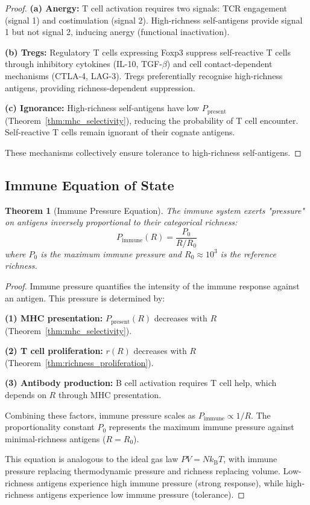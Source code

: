 \documentclass[11pt,twocolumn,a4paper]{article}
\newtheorem{theorem}{Theorem}[section]
\theoremstyle{definition}
\theoremstyle{remark}
\newcommand{\kB}{k_{\mathrm{B}}}
\begin{document}
\begin{proof}
\textbf{(a) Anergy:} T cell activation requires two signals: TCR engagement (signal 1) and costimulation (signal 2). High-richness self-antigens provide signal 1 but not signal 2, inducing anergy (functional inactivation).

\textbf{(b) Tregs:} Regulatory T cells expressing Foxp3 suppress self-reactive T cells through inhibitory cytokines (IL-10, TGF-$\beta$) and cell contact-dependent mechanisms (CTLA-4, LAG-3). Tregs preferentially recognise high-richness antigens, providing richness-dependent suppression.

\textbf{(c) Ignorance:} High-richness self-antigens have low $P_{\mathrm{present}}$ (Theorem~\ref{thm:mhc_selectivity}), reducing the probability of T cell encounter. Self-reactive T cells remain ignorant of their cognate antigens.

These mechanisms collectively ensure tolerance to high-richness self-antigens.
\end{proof}

\subsection{Immune Equation of State}

\begin{theorem}[Immune Pressure Equation]
\label{thm:immune_pressure}
The immune system exerts "pressure" on antigens inversely proportional to their categorical richness:
\begin{equation}
P_{\mathrm{immune}}(R) = \frac{P_0}{R/R_0}
\label{eq:immune_pressure}
\end{equation}
where $P_0$ is the maximum immune pressure and $R_0 \approx 10^3$ is the reference richness.
\end{theorem}

\begin{proof}
Immune pressure quantifies the intensity of the immune response against an antigen. This pressure is determined by:

\textbf{(1) MHC presentation:} $P_{\mathrm{present}}(R)$ decreases with $R$ (Theorem~\ref{thm:mhc_selectivity}).

\textbf{(2) T cell proliferation:} $r(R)$ decreases with $R$ (Theorem~\ref{thm:richness_proliferation}).

\textbf{(3) Antibody production:} B cell activation requires T cell help, which depends on $R$ through MHC presentation.

Combining these factors, immune pressure scales as $P_{\mathrm{immune}} \propto 1/R$. The proportionality constant $P_0$ represents the maximum immune pressure against minimal-richness antigens ($R = R_0$).

This equation is analogous to the ideal gas law $PV = N\kB T$, with immune pressure replacing thermodynamic pressure and richness replacing volume. Low-richness antigens experience high immune pressure (strong response), while high-richness antigens experience low immune pressure (tolerance).
\end{proof}
\end{document}
